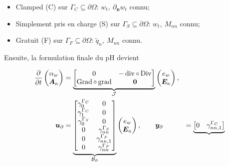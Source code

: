 \begin{itemize}
\item Clamped (C) sur $ \Gamma_{C} \subseteq \partial \Omega $: $ w_t, \ \partial_{\bm{n}} {w_t} $ connu;
\item Simplement pris en charge (S) sur $ \Gamma_{S} \subseteq \partial\Omega $: $ w_t, \ M_{nn} $ connu;
\item Gratuit (F) sur $ \Gamma_{F} \subseteq \partial \Omega $: $ \widetilde {q}_n, \ M_{nn} $ connu.
\end{itemize}
Ensuite, la formulation finale du pH devient
	
\begin{equation}
\begin{aligned}
\displaystyle
\diffp{}{t}
\begin{pmatrix}
\alpha_w \\
\bm{A}_{\kappa} \\
\end{pmatrix} &= 
\underbrace{\begin{bmatrix}
	0  &  - \div \circ \Div \\
	\Grad \circ \grad & \bm{0} \\
	\end{bmatrix}}_{\mathcal{J}}
\begin{pmatrix}
e_w \\
\bm{E}_{\kappa} \\
\end{pmatrix}, \vspace{3pt}\\
\bm{u}_\partial &= \underbrace{
	\begin{bmatrix}
	\gamma_{0}^{\Gamma_C} & {0}  \\
	\gamma_1^{\Gamma_C} &  {0} \\
	\gamma_{0}^{\Gamma_S} &  {0}  \\
	{0} & \gamma_{nn}^{\Gamma_S} \\
	{0} & \gamma_{nn, 1}^{\Gamma_F}  \\
	{0} & \gamma_{nn}^{\Gamma_F}\\
	\end{bmatrix}}_{\mathcal{B}_\partial} \begin{pmatrix}
e_w \\
\bm{E}_{\kappa} \\
\end{pmatrix}, \vspace{3pt}\qquad
\bm{y}_\partial &= \underbrace{
	\begin{bmatrix}
	{0} & \gamma_{nn, 1}^{\Gamma_C} \\

\end{bmatrix}}
\end{aligned}
\end{equation}
